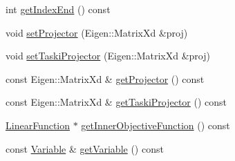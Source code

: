 \begin{DoxyCompactItemize}
\item 
int \hyperlink{classgocra_1_1GHCJTTask_a4a6c3086e34d30638dae944de48dcde1}{get\+Index\+End} () const
\item 
void \hyperlink{classgocra_1_1GHCJTTask_a391580beeeb10e00c4cd88e9fe241a2c}{set\+Projector} (Eigen\+::\+Matrix\+Xd \&proj)
\item 
void \hyperlink{classgocra_1_1GHCJTTask_a8a6eff40a7476c8715a4cfbac756655e}{set\+Taski\+Projector} (Eigen\+::\+Matrix\+Xd \&proj)
\item 
const Eigen\+::\+Matrix\+Xd \& \hyperlink{classgocra_1_1GHCJTTask_a666a371b1f2d20dcfd7d85a131c2c2df}{get\+Projector} () const
\item 
const Eigen\+::\+Matrix\+Xd \& \hyperlink{classgocra_1_1GHCJTTask_afb71d62a6e57292529af427c09f92465}{get\+Taski\+Projector} () const
\item 
\hyperlink{classocra_1_1LinearFunction}{Linear\+Function} $\ast$ \hyperlink{classgocra_1_1GHCJTTask_af38e11377a98b3adcdb9b4e47d55fae0}{get\+Inner\+Objective\+Function} () const
\item 
const \hyperlink{classocra_1_1Variable}{Variable} \& \hyperlink{classgocra_1_1GHCJTTask_a9ba33bc965fe2d39a7758bca2d41005a}{get\+Variable} () const
\end{DoxyCompactItemize}
